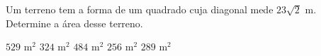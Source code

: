 \noindent\parbox{\linewidth}{

Um terreno tem a forma de um quadrado cuja diagonal mede $23\sqrt{2}$ m. Determine a área desse terreno.

$529$ m$^2$
$324$ m$^2$
$484$ m$^2$
$256$ m$^2$
$289$ m$^2$



}


